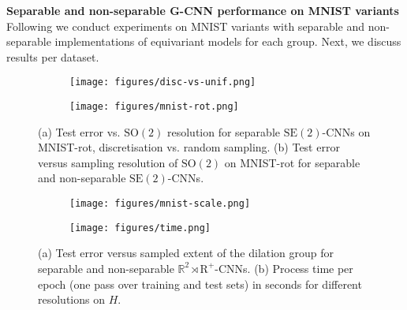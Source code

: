 \documentclass[nohyperref]{article}
\theoremstyle{plain}
\theoremstyle{definition}
\theoremstyle{remark}
\newcommand{\R}{\mathbb{R}}
\begin{document}
\textbf{Separable and non-separable G-CNN performance on MNIST variants}
Following \citet{cohen2016group,weiler2018learning,sosnovik2019scale, finzi2020generalizing} we conduct experiments on MNIST variants with separable and non-separable implementations of equivariant models for each group. Next, we discuss results per dataset.

\begin{figure}
\centering
    \begin{subfigure}[b]{0.23\textwidth}
        \texttt{[image: figures/disc-vs-unif.png]}
        \caption{\vspace{-3mm}}
        \label{fig:discvsunif}
    \end{subfigure}
    \begin{subfigure}[b]{0.23\textwidth}
        \texttt{[image: figures/mnist-rot.png]}
        \caption{\vspace{-3mm}}
        \label{fig:mnistrot}    
    \end{subfigure}
\caption{(a) Test error vs. $\mathrm{SO(2)}$ resolution for separable $\mathrm{SE(2)}$-CNNs on MNIST-rot, discretisation vs. random sampling. (b) Test error versus sampling resolution of $\mathrm{SO(2)}$ on MNIST-rot for separable and non-separable $\mathrm{SE(2)}$-CNNs.}
\end{figure}

\begin{figure}
    \centering
    \begin{subfigure}[b]{0.23\textwidth}
        \texttt{[image: figures/mnist-scale.png]}
        \caption{\vspace{-3mm}}
        \label{fig:mnistscale}
    \end{subfigure}
    \begin{subfigure}[b]{0.23\textwidth}
        \texttt{[image: figures/time.png]}
        \caption{\vspace{-3mm}}
        \label{fig:traintime}
    \end{subfigure} 
    \caption{(a) Test error versus sampled extent of the dilation group for separable and non-separable $\mathrm{\R^2 \rtimes R^+}$-CNNs. (b) Process time per epoch (one pass over training and test sets) in seconds for different resolutions on $H$.}
    \label{fig:scalemnist-processtime}
\end{figure}
\end{document}
